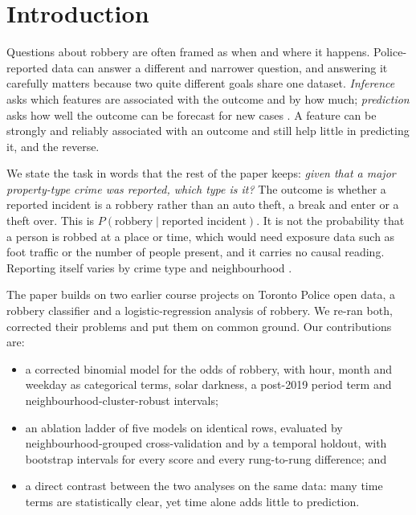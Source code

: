 \section{Introduction}
Questions about robbery are often framed as when and where it happens. Police-reported data can answer a different and narrower question, and answering it carefully matters because two quite different goals share one dataset.
\emph{Inference} asks which features are associated with the outcome and by how much; \emph{prediction} asks how well the outcome can be forecast for new cases \citep{shmueli2010explain,breiman2001two}. A feature can be strongly and reliably associated with an outcome and still help little in predicting it, and the reverse.

We state the task in words that the rest of the paper keeps: \emph{given that a major property-type crime was reported, which type is it?} The outcome is whether a reported incident is a robbery rather than an auto theft, a break and enter or a theft over. This is $P(\text{robbery}\mid\text{reported incident})$. It is not the probability that a person is robbed at a place or time, which would need exposure data such as foot traffic or the number of people present, and it carries no causal reading. Reporting itself varies by crime type and neighbourhood \citep{skogan1975dark,lum2016predict}.

The paper builds on two earlier course projects on Toronto Police open data, a robbery classifier and a logistic-regression analysis of robbery. We re-ran both, corrected their problems and put them on common ground. Our contributions are:
\begin{itemize}
  \item a corrected binomial model for the odds of robbery, with hour, month and weekday as categorical terms, solar darkness, a post-2019 period term and neighbourhood-cluster-robust intervals;
  \item an ablation ladder of five models on identical rows, evaluated by neighbourhood-grouped cross-validation and by a temporal holdout, with bootstrap intervals for every score and every rung-to-rung difference; and
  \item a direct contrast between the two analyses on the same data: many time terms are statistically clear, yet time alone adds little to prediction.
\end{itemize}
